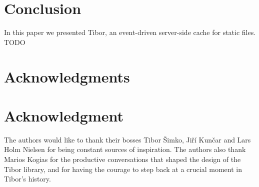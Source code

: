 \documentclass[conference,compsoc]{IEEEtran}
\begin{document}
\section{Conclusion}
In this paper we presented Tibor, an event-driven server-side cache for static
files. TODO

\ifCLASSOPTIONcompsoc
  \section*{Acknowledgments}
\else
  \section*{Acknowledgment}
\fi

The authors would like to thank their bosses Tibor Šimko, Jiří Kunčar and Lars
Holm Nielsen for being constant sources of inspiration. The authors also thank
Marios Kogias for the productive conversations that shaped the design of the
Tibor library, and for having the courage to step back at a crucial moment in
Tibor's history.
\end{document}
